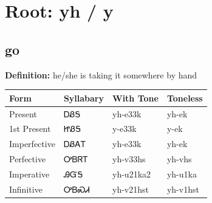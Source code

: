 \documentclass{article}%
\begin{document}
%
\normalsize%
\section*{Root: yh / y}%
\subsection*{go}%
\textbf{Definition: }%
he/she is taking it somewhere by hand%
\\[0.5em]%
\begin{tabular}{|l|l|l|l|}%
\hline%
\textbf{Form}&\textbf{Syllabary}&\textbf{With Tone}&\textbf{Toneless}\\%
\hline%
Present&ᎠᏰᎦ&yh{-}e33k&yh{-}ek\\%
1st Present&ᏥᏰᎦ&y{-}e33k&y{-}ek\\%
Imperfective&ᎠᏰᎪᎢ&yh{-}e33k&yh{-}ek\\%
Perfective&ᎤᏴᏒᎢ&yh{-}v33hs&yh{-}vhs\\%
Imperative&ᎯᏳᎦ&yh{-}u21ka2&yh{-}u1ka\\%
Infinitive&ᎤᏴᏍᏗ&yh{-}v21hst&yh{-}v1hst\\%
\hline%
\end{tabular}%
\\[1em]%
\end{document}
